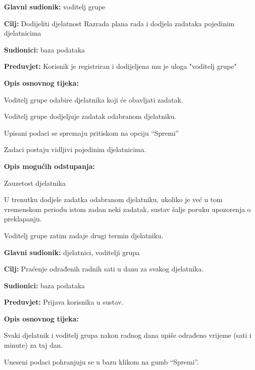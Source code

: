 			\begin{packed_item}
				\item \textbf{Glavni sudionik: } voditelj grupe
				\item  \textbf{Cilj:} Dodijeliti djelatnost Razrada plana rada i dodjela zadataka pojedinim djelatnicima
				\item  \textbf{Sudionici:} baza podataka
				\item  \textbf{Preduvjet:} Korisnik je registriran i dodijeljena mu je uloga "voditelj grupe"
				\item  \textbf{Opis osnovnog tijeka:}
				\item[] \begin{packed_enum}
					\item Voditelj grupe odabire djelatnika koji će obavljati zadatak.
					\item Voditelj grupe dodjeljuje zadatak odabranom djelatniku.
					\item Upisani podaci se spremaju pritiskom na opciju “Spremi” 
					\item Zadaci postaju vidljivi pojedinim djelatnicima. 
				\end{packed_enum}
				\item  \textbf{Opis mogućih odstupanja:}
				\item[] \begin{packed_item}
					\item[2.a] Zauzetost djelatnika
					\item[] \begin{packed_enum}
						\item U trenutku dodjele zadatka odabranom djelatniku, ukoliko je već u tom vremenskom periodu istom zadan neki zadatak, sustav šalje poruku upozorenja o preklapanju. 
						\item Voditelj grupe zatim zadaje drugi termin djelatniku. 
					\end{packed_enum}
				\end{packed_item}
			\end{packed_item}
			\noindent \underbar{\textbf{UC13 - Upis odrađenih sati}}
			\begin{packed_item}
				\item \textbf{Glavni sudionik: } djelatnici, voditelji grupa
				\item  \textbf{Cilj:} Praćenje odrađenih radnih sati u danu za svakog djelatnika.
				\item  \textbf{Sudionici:} baza podataka
				\item  \textbf{Preduvjet:} Prijava korisnika u sustav.
				\item  \textbf{Opis osnovnog tijeka:}
				\item[] \begin{packed_enum}
					\item Svaki djelatnik i voditelj grupa nakon radnog dana upiše odrađeno vrijeme (sati i minute) za taj dan.
					\item Uneseni podaci pohranjuju se u bazu klikom na gumb “Spremi”. 
				\end{packed_enum}
			\end{packed_item}
